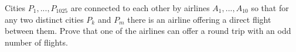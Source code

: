 Cities $P_1,...,P_{1025}$ are connected to each other by airlines $A_1,...,A_{10}$ so that for any two distinct cities $P_k$ and $P_m$ there is an airline offering a direct flight between them. Prove that one of the airlines can offer a round trip with an odd number of flights.